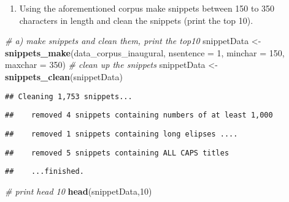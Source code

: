 \documentclass[]{article}
\newenvironment{Shaded}{\begin{snugshade}}{\end{snugshade}}
\newcommand{\KeywordTok}[1]{\textcolor[rgb]{0.13,0.29,0.53}{\textbf{#1}}}
\newcommand{\DataTypeTok}[1]{\textcolor[rgb]{0.13,0.29,0.53}{#1}}
\newcommand{\DecValTok}[1]{\textcolor[rgb]{0.00,0.00,0.81}{#1}}
\newcommand{\StringTok}[1]{\textcolor[rgb]{0.31,0.60,0.02}{#1}}
\newcommand{\CommentTok}[1]{\textcolor[rgb]{0.56,0.35,0.01}{\textit{#1}}}
\newcommand{\NormalTok}[1]{#1}
\providecommand{\tightlist}{%
  \setlength{\itemsep}{0pt}\setlength{\parskip}{0pt}}
\begin{document}
\begin{enumerate}
\def\labelenumi{(\alph{enumi})}
\tightlist
\item
  Using the aforementioned corpus make snippets between 150 to 350
  characters in length and clean the snippets (print the top 10).
\end{enumerate}

\begin{Shaded}
\begin{Highlighting}[]
\CommentTok{# a) make snippets and clean them, print the top10}
\NormalTok{snippetData <-}\StringTok{ }\KeywordTok{snippets_make}\NormalTok{(data_corpus_inaugural, }\DataTypeTok{nsentence =} \DecValTok{1}\NormalTok{, }\DataTypeTok{minchar =} \DecValTok{150}\NormalTok{, }\DataTypeTok{maxchar =} \DecValTok{350}\NormalTok{)}
\CommentTok{# clean up the snippets}
\NormalTok{snippetData <-}\StringTok{ }\KeywordTok{snippets_clean}\NormalTok{(snippetData)}
\end{Highlighting}
\end{Shaded}

\begin{verbatim}
## Cleaning 1,753 snippets...
\end{verbatim}

\begin{verbatim}
##    removed 4 snippets containing numbers of at least 1,000
\end{verbatim}

\begin{verbatim}
##    removed 1 snippets containing long elipses ....
\end{verbatim}

\begin{verbatim}
##    removed 5 snippets containing ALL CAPS titles
\end{verbatim}

\begin{verbatim}
##    ...finished.
\end{verbatim}

\begin{Shaded}
\begin{Highlighting}[]
\CommentTok{# print head 10}
\KeywordTok{head}\NormalTok{(snippetData,}\DecValTok{10}\NormalTok{)}
\end{Highlighting}
\end{Shaded}
\end{document}
